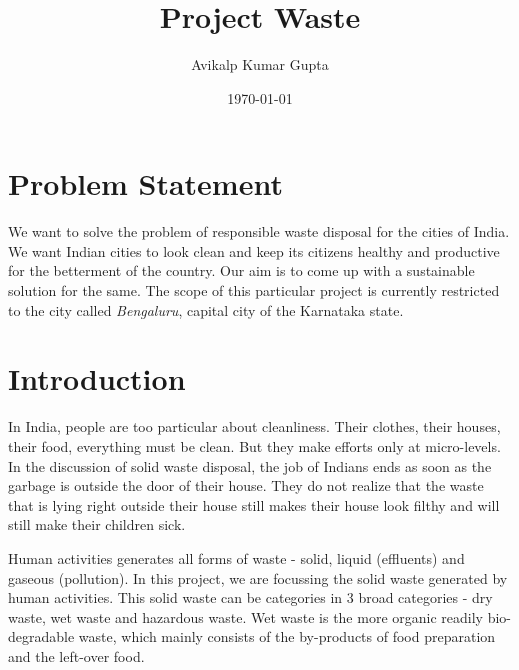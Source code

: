 \documentclass[10pt]{article}
\title{Project Waste}
\author{Avikalp Kumar Gupta}
\date{\today}
\begin{document}
\maketitle

\tableofcontents

\pagebreak

\begin{abstract}



\end{abstract}

\section{Problem Statement}

We want to solve the problem of responsible waste disposal for the cities of India. We want Indian cities to look clean and keep its citizens healthy and productive for the betterment of the country. Our aim is to come up with a sustainable solution for the same. The scope of this particular project is currently restricted to the city called \emph{Bengaluru}, capital city of the Karnataka state. 

\section{Introduction}

In India, people are too particular about cleanliness. Their clothes, their houses, their food, everything must be clean. But they make efforts only at micro-levels. In the discussion of solid waste disposal, the job of Indians ends as soon as the garbage is outside the door of their house. They do not realize that the waste that is lying right outside their house still makes their house look filthy and will still make their children sick. 

Human activities generates all forms of waste - solid, liquid (effluents) and gaseous (pollution). In this project, we are focussing the solid waste generated by human activities. This solid waste can be categories in 3 broad categories - dry waste, wet waste and hazardous waste. Wet waste is the more organic readily bio-degradable waste, which mainly consists of the by-products of food preparation and the left-over food.
\end{document}
